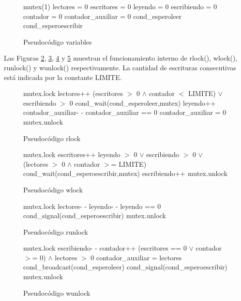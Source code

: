 \begin{figure}[!htb]
\begin{codebox}
 mutex(1)
 lectores = 0
 escritores = 0
 leyendo = 0
 escribiendo = 0
 contador = 0
 contador_auxiliar = 0
 cond_esperoleer
 cond_esperoescribir
\end{codebox}
\caption{Pseudocódigo variables}\label{cod-variables}
\end{figure}

Las Figuras \ref{cod-rlock}, \ref{cod-wlock}, \ref{cod-runlock} y \ref{cod-wunlock} muestran el funcionamiento interno de {\sc rlock(), wlock(), runlock()} y {\sc wunlock()} respectivamente.  La cantidad de escrituras consecutivas está indicada por la constante LIMITE.

\begin{figure}[!htb]
\begin{codebox}
\li mutex.lock
\li lectores++
\li \While (escritores $>$ 0 $\wedge$ contador $<$ LIMITE) $\vee$ escribiendo $>$ 0
\li \Do cond_wait(cond_esperoleer,mutex)
 	\End
\li leyendo++
\li contador_auxiliar- -
\li \If contador_auxiliar == 0
\li \Then contador_auxiliar = 0
	\End
\li mutex.unlock
\end{codebox}
\caption{Pseudocódigo rlock}\label{cod-rlock}
\end{figure}

\begin{figure}[!htb]
\begin{codebox}
\li mutex.lock
\li escritores++
\li \While leyendo $>$ 0 $\vee$ escribiendo $>$ 0 $\vee$ (lectores $>$ 0 $\wedge$ contador $>$= LIMITE)
\li \Do cond_wait(cond_esperoescribir,mutex)
 	\End
\li escribiendo++
\li mutex.unlock
\end{codebox}
\caption{Pseudocódigo wlock}\label{cod-wlock}
\end{figure}

\begin{figure}[!htb]
\begin{codebox}
\li mutex.lock
\li lectores- -
\li leyendo- -
\li \If leyendo == 0
\li \Then cond_signal(cond_esperoescribir)
 	\End
\li mutex.unlock
\end{codebox}
\caption{Pseudocódigo runlock}\label{cod-runlock}
\end{figure}

\begin{figure}[!htb]
\begin{codebox}
\li mutex.lock
\li escribiendo- -
\li contador++
\li \If (escritores == 0 $\vee$ contador $>$= 0) $\wedge$ lectores $>$ 0
\li \Then 	contador_auxiliar = lectores
\li 			cond_broadcast(cond_esperoleer)
\li \Else	cond_signal(cond_esperoescribir)
 	\End
\li mutex.unlock
\end{codebox}
\caption{Pseudocódigo wunlock}\label{cod-wunlock}
\end{figure}

